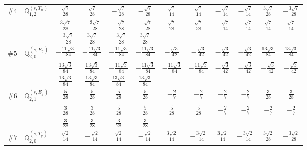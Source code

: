 \documentclass[fleqn,9pt,landscape]{jsarticle}
\begin{document}
\begin{center}
\begin{longtable}{lcccccccccc}
$ \#4\quad \mathbb{Q}_{1,2}^{(s,T_{u})} $ & $ \frac{\sqrt{7}}{28} $ & $ \frac{\sqrt{7}}{28} $ & $ - \frac{\sqrt{7}}{28} $ & $ - \frac{\sqrt{7}}{28} $ & $ \frac{\sqrt{7}}{14} $ & $ \frac{\sqrt{7}}{14} $ & $ - \frac{\sqrt{7}}{14} $ & $ - \frac{\sqrt{7}}{14} $ & $ \frac{3 \sqrt{7}}{28} $ & $ - \frac{3 \sqrt{7}}{28} $ \\
& $ \frac{3 \sqrt{7}}{28} $ & $ - \frac{3 \sqrt{7}}{28} $ & $ - \frac{\sqrt{7}}{28} $ & $ - \frac{\sqrt{7}}{28} $ & $ \frac{\sqrt{7}}{28} $ & $ \frac{\sqrt{7}}{28} $ & $ - \frac{\sqrt{7}}{14} $ & $ - \frac{\sqrt{7}}{14} $ & $ \frac{\sqrt{7}}{14} $ & $ \frac{\sqrt{7}}{14} $ \\
& $ - \frac{3 \sqrt{7}}{28} $ & $ \frac{3 \sqrt{7}}{28} $ & $ - \frac{3 \sqrt{7}}{28} $ & $ \frac{3 \sqrt{7}}{28} $ & $  $ & $  $ & $  $ & $  $ & $  $ & $  $ \\ \hline
$ \#5\quad \mathbb{Q}_{2,0}^{(s,E_{g})} $ & $ - \frac{11 \sqrt{3}}{84} $ & $ - \frac{11 \sqrt{3}}{84} $ & $ - \frac{11 \sqrt{3}}{84} $ & $ - \frac{11 \sqrt{3}}{84} $ & $ - \frac{\sqrt{3}}{42} $ & $ - \frac{\sqrt{3}}{42} $ & $ - \frac{\sqrt{3}}{42} $ & $ - \frac{\sqrt{3}}{42} $ & $ \frac{13 \sqrt{3}}{84} $ & $ \frac{13 \sqrt{3}}{84} $ \\
& $ \frac{13 \sqrt{3}}{84} $ & $ \frac{13 \sqrt{3}}{84} $ & $ - \frac{11 \sqrt{3}}{84} $ & $ - \frac{11 \sqrt{3}}{84} $ & $ - \frac{11 \sqrt{3}}{84} $ & $ - \frac{11 \sqrt{3}}{84} $ & $ - \frac{\sqrt{3}}{42} $ & $ - \frac{\sqrt{3}}{42} $ & $ - \frac{\sqrt{3}}{42} $ & $ - \frac{\sqrt{3}}{42} $ \\
& $ \frac{13 \sqrt{3}}{84} $ & $ \frac{13 \sqrt{3}}{84} $ & $ \frac{13 \sqrt{3}}{84} $ & $ \frac{13 \sqrt{3}}{84} $ & $  $ & $  $ & $  $ & $  $ & $  $ & $  $ \\ \hline
$ \#6\quad \mathbb{Q}_{2,1}^{(s,E_{g})} $ & $ \frac{5}{28} $ & $ \frac{5}{28} $ & $ \frac{5}{28} $ & $ \frac{5}{28} $ & $ - \frac{2}{7} $ & $ - \frac{2}{7} $ & $ - \frac{2}{7} $ & $ - \frac{2}{7} $ & $ \frac{3}{28} $ & $ \frac{3}{28} $ \\
& $ \frac{3}{28} $ & $ \frac{3}{28} $ & $ \frac{5}{28} $ & $ \frac{5}{28} $ & $ \frac{5}{28} $ & $ \frac{5}{28} $ & $ - \frac{2}{7} $ & $ - \frac{2}{7} $ & $ - \frac{2}{7} $ & $ - \frac{2}{7} $ \\
& $ \frac{3}{28} $ & $ \frac{3}{28} $ & $ \frac{3}{28} $ & $ \frac{3}{28} $ & $  $ & $  $ & $  $ & $  $ & $  $ & $  $ \\ \hline
$ \#7\quad \mathbb{Q}_{2,0}^{(s,T_{g})} $ & $ \frac{\sqrt{2}}{14} $ & $ - \frac{\sqrt{2}}{14} $ & $ \frac{\sqrt{2}}{14} $ & $ - \frac{\sqrt{2}}{14} $ & $ \frac{3 \sqrt{2}}{14} $ & $ - \frac{3 \sqrt{2}}{14} $ & $ \frac{3 \sqrt{2}}{14} $ & $ - \frac{3 \sqrt{2}}{14} $ & $ \frac{3 \sqrt{2}}{28} $ & $ - \frac{3 \sqrt{2}}{28} $ \\

\end{longtable}
\end{center}
\end{document}
